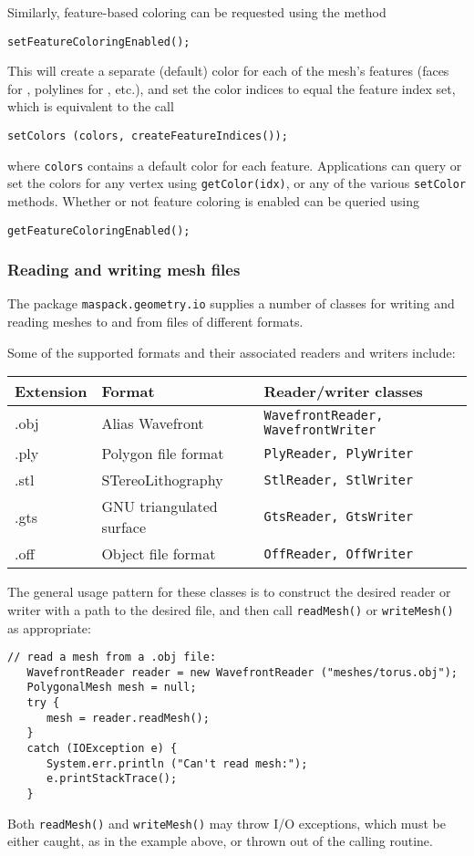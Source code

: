 Similarly, feature-based coloring can be requested using the method
%
\begin{lstlisting}[]
   setFeatureColoringEnabled();
\end{lstlisting}
%
This will create a separate (default) color for each of the mesh's
features (faces for 
, polylines for
, etc.),
and set the color indices to equal the feature 
index set, which is equivalent to the call
%
\begin{lstlisting}[]
   setColors (colors, createFeatureIndices());
\end{lstlisting}
%
where {\tt colors} contains a default color for each feature.
Applications can query or set the colors
for any vertex using {\tt getColor(idx)}, or any of the
various {\tt setColor} methods. Whether or not feature coloring
is enabled can be queried using
%
\begin{lstlisting}[]
   getFeatureColoringEnabled();
\end{lstlisting}
%

\subsubsection{Reading and writing mesh files}
\label{MeshFileIO:sec}

The package {\tt maspack.geometry.io} supplies a number of classes for
writing and reading meshes to and from files of different formats.

Some of the supported formats and their associated readers and writers
include:

\begin{tabular}{|lll|}
\hline
Extension & Format & Reader/writer classes \\
\hline
.obj & Alias Wavefront & \tt WavefrontReader, WavefrontWriter \\
.ply & Polygon file format & \tt PlyReader, PlyWriter \\
.stl & STereoLithography & \tt StlReader, StlWriter \\
.gts & GNU triangulated surface & \tt GtsReader, GtsWriter \\
.off & Object file format & \tt OffReader, OffWriter \\
\hline
\end{tabular}

The general usage pattern for these classes is to construct the
desired reader or writer with a path to the desired file, and then
call {\tt readMesh()} or {\tt writeMesh()} as appropriate:
%
\begin{lstlisting}[]
   // read a mesh from a .obj file:
   WavefrontReader reader = new WavefrontReader ("meshes/torus.obj");
   PolygonalMesh mesh = null;
   try {
      mesh = reader.readMesh();
   }
   catch (IOException e) {
      System.err.println ("Can't read mesh:");
      e.printStackTrace();
   }
\end{lstlisting}
%
Both {\tt readMesh()} and {\tt writeMesh()} may throw I/O exceptions,
which must be either caught, as in the example above, or
thrown out of the calling routine.

